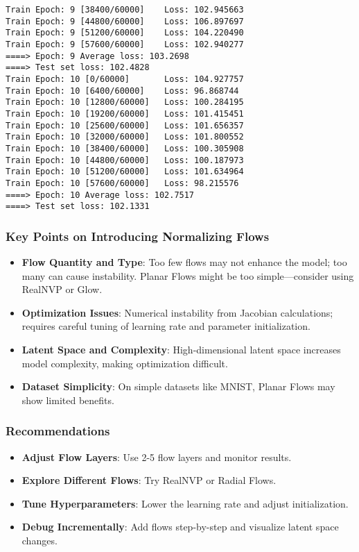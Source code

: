 \documentclass[11pt]{article}
\providecommand{\tightlist}{%
      \setlength{\itemsep}{0pt}\setlength{\parskip}{0pt}}
\begin{document}
\begin{Verbatim}[commandchars=\\\{\}]
Train Epoch: 9 [38400/60000]    Loss: 102.945663
Train Epoch: 9 [44800/60000]    Loss: 106.897697
Train Epoch: 9 [51200/60000]    Loss: 104.220490
Train Epoch: 9 [57600/60000]    Loss: 102.940277
====> Epoch: 9 Average loss: 103.2698
====> Test set loss: 102.4828
Train Epoch: 10 [0/60000]       Loss: 104.927757
Train Epoch: 10 [6400/60000]    Loss: 96.868744
Train Epoch: 10 [12800/60000]   Loss: 100.284195
Train Epoch: 10 [19200/60000]   Loss: 101.415451
Train Epoch: 10 [25600/60000]   Loss: 101.656357
Train Epoch: 10 [32000/60000]   Loss: 101.800552
Train Epoch: 10 [38400/60000]   Loss: 100.305908
Train Epoch: 10 [44800/60000]   Loss: 100.187973
Train Epoch: 10 [51200/60000]   Loss: 101.634964
Train Epoch: 10 [57600/60000]   Loss: 98.215576
====> Epoch: 10 Average loss: 102.7517
====> Test set loss: 102.1331
    \end{Verbatim}

    \subsubsection{Key Points on Introducing Normalizing
Flows}\label{key-points-on-introducing-normalizing-flows}

\begin{itemize}
\item
  \textbf{Flow Quantity and Type}: Too few flows may not enhance the
  model; too many can cause instability. Planar Flows might be too
  simple---consider using RealNVP or Glow.
\item
  \textbf{Optimization Issues}: Numerical instability from Jacobian
  calculations; requires careful tuning of learning rate and parameter
  initialization.
\item
  \textbf{Latent Space and Complexity}: High-dimensional latent space
  increases model complexity, making optimization difficult.
\item
  \textbf{Dataset Simplicity}: On simple datasets like MNIST, Planar
  Flows may show limited benefits.
\end{itemize}

\subsubsection{Recommendations}\label{recommendations}

\begin{itemize}
\tightlist
\item
  \textbf{Adjust Flow Layers}: Use 2-5 flow layers and monitor results.
\item
  \textbf{Explore Different Flows}: Try RealNVP or Radial Flows.
\item
  \textbf{Tune Hyperparameters}: Lower the learning rate and adjust
  initialization.
\item
  \textbf{Debug Incrementally}: Add flows step-by-step and visualize
  latent space changes.
\end{itemize}
\end{document}
